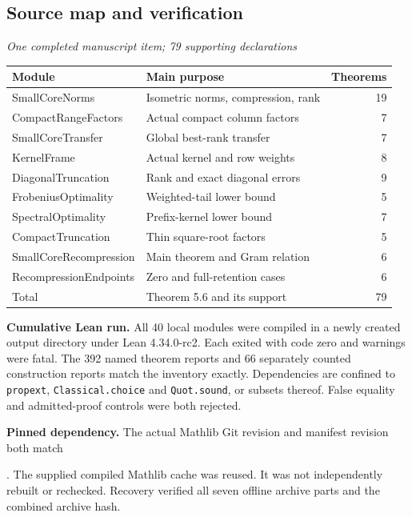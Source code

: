 \subsection{Source map and verification}\label{supp6:subsection:006}\textit{One completed manuscript item; 79 supporting declarations}\par
\begin{center}\small
\renewcommand{\arraystretch}{1.18}
\begin{tabular}{@{}p{}p{}r@{}}
\toprule
Module & Main purpose & Theorems\\
\midrule
SmallCoreNorms & Isometric norms, compression, rank & 19\\
CompactRangeFactors & Actual compact column factors & 7\\
SmallCoreTransfer & Global best-rank transfer & 7\\
KernelFrame & Actual kernel and row weights & 8\\
DiagonalTruncation & Rank and exact diagonal errors & 9\\
FrobeniusOptimality & Weighted-tail lower bound & 5\\
SpectralOptimality & Prefix-kernel lower bound & 7\\
CompactTruncation & Thin square-root factors & 5\\
SmallCoreRecompression & Main theorem and Gram relation & 6\\
RecompressionEndpoints & Zero and full-retention cases & 6\\
\midrule
Total & Theorem 5.6 and its support & 79\\
\bottomrule
\end{tabular}
\end{center}

\textbf{Cumulative Lean run.} All 40 local modules were compiled in a newly created output directory under Lean 4.34.0-rc2. Each exited with code zero and warnings were fatal. The 392 named theorem reports and 66 separately counted construction reports match the inventory exactly. Dependencies are confined to \texttt{propext}, \texttt{Classical.choice} and \texttt{Quot.sound}, or subsets thereof. False equality and admitted-proof controls were both rejected.

\textbf{Pinned dependency.} The actual Mathlib Git revision and manifest revision both match\par
{}.
The supplied compiled Mathlib cache was reused. It was not independently rebuilt or rechecked. Recovery verified all seven offline archive parts and the combined archive hash.

